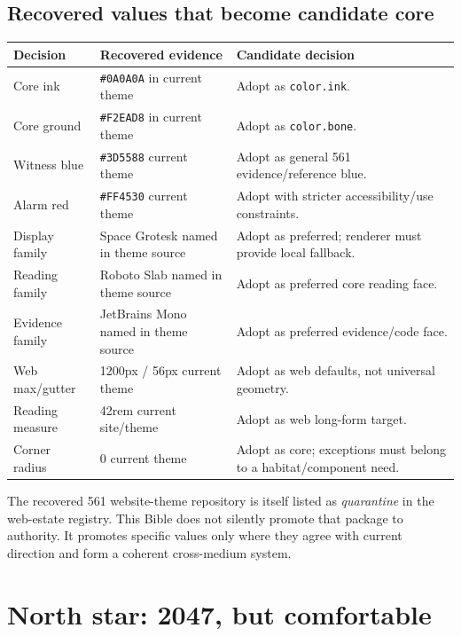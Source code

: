 \documentclass[11pt,twoside,openany]{report}
\begin{document}
\section{Recovered values that become candidate core}
\begin{tabularx}{\textwidth}{@{}L{33mm}L{43mm}Y@{}}
\toprule
Decision & Recovered evidence & Candidate decision\\
\midrule
Core ink & \texttt{\#0A0A0A} in current theme & Adopt as \nolinkurl{color.ink}.\\
Core ground & \texttt{\#F2EAD8} in current theme & Adopt as \nolinkurl{color.bone}.\\
Witness blue & \texttt{\#3D5588} current theme & Adopt as general 561 evidence/reference blue.\\
Alarm red & \texttt{\#FF4530} current theme & Adopt with stricter accessibility/use constraints.\\
Display family & Space Grotesk named in theme source & Adopt as preferred; renderer must provide local fallback.\\
Reading family & Roboto Slab named in theme source & Adopt as preferred core reading face.\\
Evidence family & JetBrains Mono named in theme source & Adopt as preferred evidence/code face.\\
Web max/gutter & 1200px / 56px current theme & Adopt as web defaults, not universal geometry.\\
Reading measure & 42rem current site/theme & Adopt as web long-form target.\\
Corner radius & 0 current theme & Adopt as core; exceptions must belong to a habitat/component need.\\
\bottomrule
\end{tabularx}

\begin{alarmbox}
The recovered 561 website-theme repository is itself listed as \emph{quarantine} in the web-estate registry. This Bible does not silently promote that package to authority. It promotes specific values only where they agree with current direction and form a coherent cross-medium system.
\end{alarmbox}

\clearpage
\chapter{North star: 2047, but comfortable}
\end{document}
